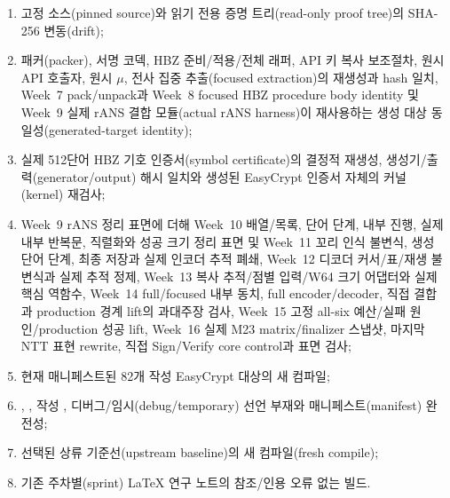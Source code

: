\begin{enumerate}
  \item 고정 소스(pinned source)와 읽기 전용 증명 트리(read-only proof tree)의
        SHA-256 변동(drift);
  \item 패커(packer), 서명 코덱, HBZ 준비/적용/전체 래퍼, API 키 복사 보조절차,
        원시 API 호출자, 원시 \(\mu\), 전사 집중 추출(focused extraction)의 재생성과 hash
        일치, Week~7 pack/unpack과 Week~8 focused HBZ procedure body identity 및
        Week~9 실제 rANS 결합 모듈(actual rANS harness)이 재사용하는 생성 대상
        동일성(generated-target identity);
  \item 실제 512단어 HBZ 기호 인증서(symbol certificate)의 결정적 재생성,
        생성기/출력(generator/output) 해시 일치와 생성된 EasyCrypt 인증서 자체의
        커널(kernel) 재검사;
  \item Week~9 rANS 정리 표면에 더해 Week~10 배열/목록, 단어 단계, 내부 진행,
        실제 내부 반복문, 직렬화와 성공 크기 정리 표면 및 Week~11 꼬리 인식
        불변식, 생성 단어 단계, 최종 저장과 실제 인코더 추적 폐쇄, Week~12
        디코더 커서/표/재생 불변식과 실제 추적 정제, Week~13 복사 추적/점별
        입력/W64 크기 어댑터와 실제 핵심 역함수, Week~14 full/focused 내부
        동치, full encoder/decoder, 직접 결합과 production 경계 lift의
        과대주장 검사, Week~15 고정 all-six 예산/실패 원인/production 성공 lift,
        Week~16 실제 M23 matrix/finalizer 스냅샷, 마지막 NTT 표현 rewrite,
        직접 Sign/Verify core control과 
        표면 검사;
  \item 현재 매니페스트된 82개 작성 EasyCrypt 대상의  새
        컴파일;
  \item {}, , 작성 ,
        디버그/임시(debug/temporary) 선언 부재와 매니페스트(manifest) 완전성;
  \item 선택된 상류 기준선(upstream baseline)의 새 컴파일(fresh compile);
  \item 기존 주차별(sprint) LaTeX 연구 노트의 참조/인용 오류 없는 빌드.
\end{enumerate}

